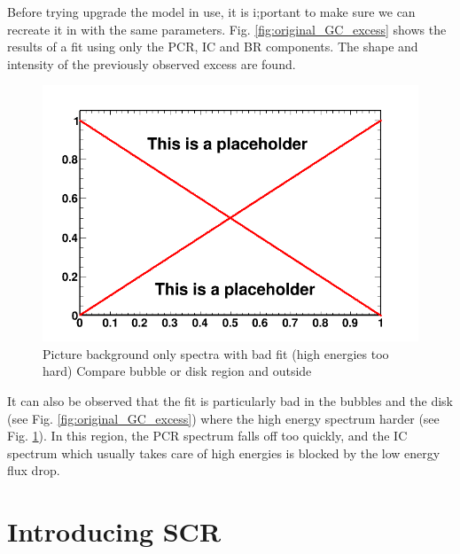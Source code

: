 Before trying upgrade the model in use, it is i;portant to make sure we can recreate it in with the same parameters. Fig. \ref{fig:original_GC_excess} shows the results of a fit using only the PCR, IC and BR components. The shape and intensity of the previously observed excess  are found.\\

\begin{figure}
  \centering
  \includegraphics[width=.9\linewidth]{pic/dummy.png}
  \caption{Picture background only spectra with bad fit (high energies too hard) Compare bubble or disk region and outside}
  \label{fig:bkgd_only_spectrum}
\end{figure}

It can also be observed that the fit is particularly bad in the bubbles and the disk (see Fig. \ref{fig:original_GC_excess}) where the high energy spectrum harder (see Fig. \ref{fig:bkgd_only_spectrum}). In this region, the PCR spectrum falls off too quickly, and the IC spectrum which usually takes care of high energies is blocked by the low energy flux drop.




\section{Introducing SCR}

